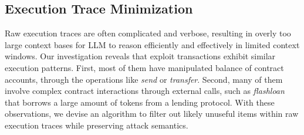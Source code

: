\subsection{Execution Trace Minimization}
Raw execution traces are often complicated and verbose, resulting in overly too large context bases for LLM to reason efficiently and effectively in limited context windows.  
Our investigation reveals that exploit transactions exhibit similar execution patterns. 
First, most of them have manipulated balance of contract accounts, through the operations like \emph{send} or \emph{transfer}.
Second, many of them involve complex contract interactions through external calls, such as \emph{flashloan} that borrows a large amount of tokens from a lending protocol.
With these observations, we devise an algorithm to filter out likely unuseful items within raw execution traces while preserving attack semantics.



